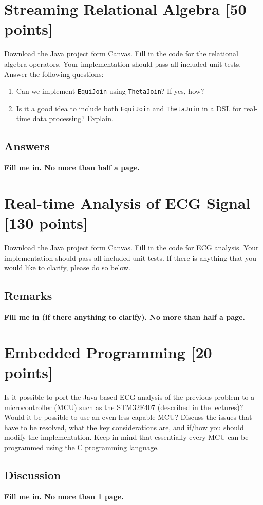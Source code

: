 \documentclass[11pt]{article}
\newcommand{\red}[1]{\textbf{\color{red} #1}}
\begin{document}
\section{Streaming Relational Algebra [50 points]}

Download the Java project form Canvas. Fill in the code for the relational algebra operators. Your implementation should pass all included unit tests. Answer the following questions:
\begin{enumerate}
\item
Can we implement \texttt{EquiJoin} using \texttt{ThetaJoin}? If yes, how?
\item
Is it a good idea to include both \texttt{EquiJoin} and \texttt{ThetaJoin} in a DSL for real-time data processing? Explain.
\end{enumerate}

\subsection*{Answers}

\red{Fill me in. No more than half a page.}


\section{Real-time Analysis of ECG Signal [130 points]}

Download the Java project form Canvas. Fill in the code for ECG analysis. Your implementation should pass all included unit tests. If there is anything that you would like to clarify, please do so below.

\subsection*{Remarks}

\red{Fill me in (if there anything to clarify). No more than half a page.}


\section{Embedded Programming [20 points]}

Is it possible to port the Java-based ECG analysis of the previous problem to a microcontroller (MCU) such as the STM32F407 (described in the lectures)? Would it be possible to use an even less capable MCU? Discuss the issues that have to be resolved, what the key considerations are, and if/how you should modify the implementation. Keep in mind that essentially every MCU can be programmed using the C programming language.

\subsection*{Discussion}

\red{Fill me in. No more than 1 page.}
\end{document}
